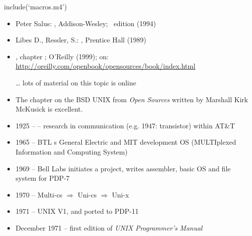 
include(`macros.m4')


\begin{slide}
\begin{itemize}
\item Peter Salus: , Addison-Wesley;
~edition (1994)
\item Libes D., Ressler, S.: , Prentice Hall (1989)
\item {},
chapter ; O'Reilly (1999); on:
\url{http://oreilly.com/openbook/opensources/book/index.html}
\item[\ldots] lots of material on this topic is online
\end{itemize}
\end{slide}

\begin{itemize}
\item The chapter on the BSD UNIX from \emph{Open Sources} written by Marshall
Kirk McKusick is excellent.
\end{itemize}


\begin{slide}
\begin{itemize}
\item 1925 --  -- research in
communication (e.g. 1947: transistor) within AT\&T
\item 1965 -- BTL s General Electric and MIT development OS 
(MULTIplexed Information and Computing System) 
\item 1969 -- Bell Labs initiates a project,  writes
assembler, basic OS and file system for PDP-7 
\item 1970 -- Multi-cs $\Rightarrow$ Uni-cs $\Rightarrow$ Uni-x
\item 1971 -- UNIX V1, and ported to PDP-11
\item December 1971 -- first edition of \emph{UNIX Programmer's Manual}
\end{itemize}
\end{slide}

